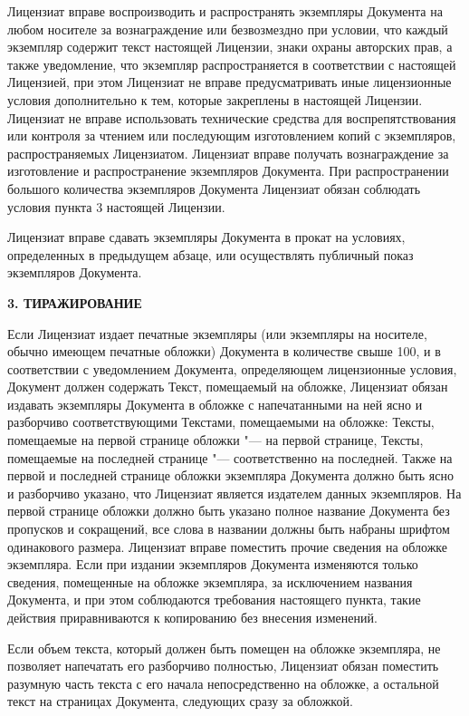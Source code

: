 Лицензиат вправе воспроизводить и распространять экземпляры Документа на
любом носителе за вознаграждение или безвозмездно при условии, что
каждый экземпляр содержит текст настоящей Лицензии, знаки охраны
авторских прав, а также уведомление, что экземпляр распространяется в
соответствии с настоящей Лицензией, при этом Лицензиат не вправе
предусматривать иные лицензионные условия дополнительно к тем, которые
закреплены в настоящей Лицензии. Лицензиат не вправе использовать
технические средства для воспрепятствования или контроля за чтением или
последующим изготовлением копий с экземпляров, распространяемых
Лицензиатом. Лицензиат вправе получать вознаграждение за изготовление и
распространение экземпляров Документа. При распространении большого
количества экземпляров Документа Лицензиат обязан соблюдать условия
пункта 3 настоящей Лицензии.

Лицензиат вправе сдавать экземпляры Документа в прокат на условиях,
определенных в предыдущем абзаце, или осуществлять публичный показ
экземпляров Документа.


\begin{center}
{\Large\bf 3. ТИРАЖИРОВАНИЕ\par}
\end{center}


Если Лицензиат издает печатные экземпляры (или экземпляры на носителе,
обычно имеющем печатные обложки) Документа в количестве свыше 100, и в
соответствии с уведомлением Документа, определяющем лицензионные условия,
Документ должен содержать Текст, помещаемый на обложке, Лицензиат обязан
издавать экземпляры Документа в обложке с напечатанными на ней ясно и
разборчиво соответствующими Текстами, помещаемыми на обложке: Тексты,
помещаемые на первой странице обложки "--- на первой странице, Тексты,
помещаемые на последней странице "--- соответственно на последней. Также
на первой и последней странице обложки экземпляра Документа должно быть
ясно и разборчиво указано, что Лицензиат является издателем данных
экземпляров. На первой странице обложки должно быть указано полное
название Документа без пропусков и сокращений, все слова в названии
должны быть набраны шрифтом одинакового размера. Лицензиат вправе
поместить прочие сведения на обложке экземпляра. Если при издании
экземпляров Документа изменяются только сведения, помещенные на обложке
экземпляра, за исключением названия Документа, и при этом соблюдаются
требования настоящего пункта, такие действия приравниваются к
копированию без внесения изменений.

Если объем текста, который должен быть помещен на обложке экземпляра, не
позволяет напечатать его разборчиво полностью, Лицензиат обязан
поместить разумную часть текста с его начала непосредственно на обложке,
а остальной текст на страницах Документа, следующих сразу за обложкой.

